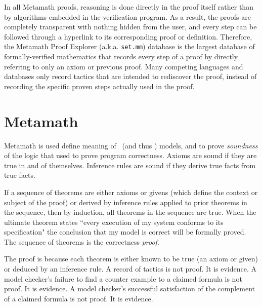 
\pn In all Metamath proofs, reasoning is done directly in the proof itself rather than by algorithms embedded in the verification program. As a result, the proofs are completely transparent with nothing hidden from the user, and every step can be followed through a hyperlink to its corresponding proof or definition. Therefore, the Metamath Proof Explorer (a.k.a. \texttt{set.mm}) database is the largest database of formally-verified mathematics that records every step of a proof by directly referring to only an axiom or previous proof.  Many competing languages and databases only record tactics that are intended to rediscover the proof, instead of recording the specific proven steps actually used in the proof. 

\section{Metamath}\label{sec:metamath}

\pn Metamath is used define meaning of \lang~(and thus \langs) models, and to prove \emph{soundness} of the logic that used to prove program correctness.   Axioms are sound if they are true in and of themselves.  Inference rules are sound if they derive true facts from true facts. 

\pn If a sequence of theorems are either axioms or givens (which define the context or subject of the proof) or derived by inference rules applied to prior theorems in the sequence, then by induction, all theorems in the sequence are true.  When the ultimate theorem states ``every execution of my system conforms to its specification" the conclusion that my model is correct will be formally proved.  The sequence of theorems is the correctness \emph{proof}.  

\pn The proof is  because each theorem is either known to be true (an axiom or given) or deduced by an inference rule.  A record of tactics is not proof.  It is evidence.  A model checker's failure to find a counter example to a claimed formula is not proof.  It is evidence.  A model checker's successful satisfaction of the complement of a claimed formula is not proof.  It is evidence.

